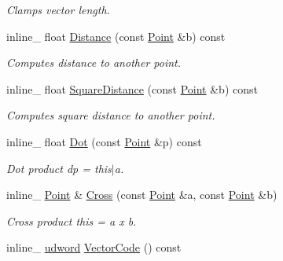 \begin{DoxyCompactItemize}
\begin{DoxyCompactList}\small\item\em Clamps vector length. \end{DoxyCompactList}\item 
\hypertarget{class_point_a4417734642ad9eb892b76000dc77e146}{inline\+\_\+ float \hyperlink{class_point_a4417734642ad9eb892b76000dc77e146}{Distance} (const \hyperlink{class_point}{Point} \&b) const }\label{class_point_a4417734642ad9eb892b76000dc77e146}

\begin{DoxyCompactList}\small\item\em Computes distance to another point. \end{DoxyCompactList}\item 
\hypertarget{class_point_aaae2329125f71f5b9e4037249cc95cb2}{inline\+\_\+ float \hyperlink{class_point_aaae2329125f71f5b9e4037249cc95cb2}{Square\+Distance} (const \hyperlink{class_point}{Point} \&b) const }\label{class_point_aaae2329125f71f5b9e4037249cc95cb2}

\begin{DoxyCompactList}\small\item\em Computes square distance to another point. \end{DoxyCompactList}\item 
\hypertarget{class_point_a2f05050d582a3b655ccb4799ecbf1f00}{inline\+\_\+ float \hyperlink{class_point_a2f05050d582a3b655ccb4799ecbf1f00}{Dot} (const \hyperlink{class_point}{Point} \&p) const }\label{class_point_a2f05050d582a3b655ccb4799ecbf1f00}

\begin{DoxyCompactList}\small\item\em Dot product dp = this$\vert$a. \end{DoxyCompactList}\item 
\hypertarget{class_point_aaf4585111503ec655a49ababa510ad6e}{inline\+\_\+ \hyperlink{class_point}{Point} \& \hyperlink{class_point_aaf4585111503ec655a49ababa510ad6e}{Cross} (const \hyperlink{class_point}{Point} \&a, const \hyperlink{class_point}{Point} \&b)}\label{class_point_aaf4585111503ec655a49ababa510ad6e}

\begin{DoxyCompactList}\small\item\em Cross product this = a x b. \end{DoxyCompactList}\item 
\hypertarget{class_point_a06e62d91a76b3f972994d0408ab1e916}{inline\+\_\+ \hyperlink{_ice_types_8h_a44c6f1920ba5551225fb534f9d1a1733}{udword} \hyperlink{class_point_a06e62d91a76b3f972994d0408ab1e916}{Vector\+Code} () const }\label{class_point_a06e62d91a76b3f972994d0408ab1e916}


\end{DoxyCompactItemize}
